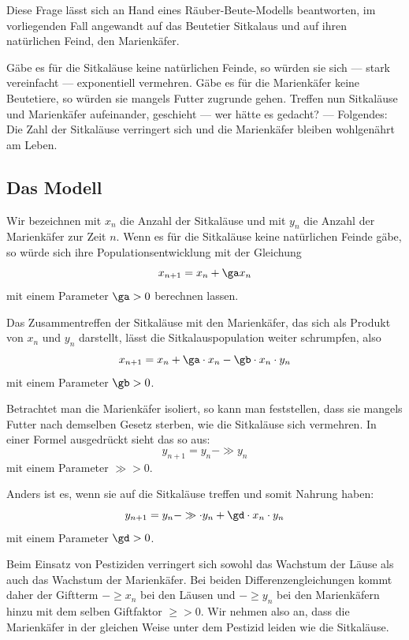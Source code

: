 \documentclass[%
11pt,%
twoside,%
titlepage,%
german,%
headsepline%
]{scrartcl}
\begin{document}
Diese Frage lässt sich an Hand eines Räuber-Beute-Modells beantworten, im vorliegenden Fall angewandt auf das Beutetier Sitkalaus und auf ihren natürlichen Feind, den Marienkäfer.

Gäbe es für die Sitkaläuse keine natürlichen Feinde, so würden sie sich --- stark vereinfacht --- exponentiell vermehren. Gäbe es für die Marienkäfer keine Beutetiere, so würden sie mangels Futter zugrunde gehen. Treffen nun Sitkaläuse und Marienkäfer aufeinander, geschieht --- wer hätte es gedacht? --- Folgendes: Die Zahl der Sitkaläuse verringert sich und die Marienkäfer bleiben wohlgenährt am Leben.

\subsection{Das Modell}
Wir bezeichnen mit $x_n$ die Anzahl der Sitkaläuse und mit $y_n$ die Anzahl der Marienkäfer zur Zeit $n$.
Wenn es für die Sitkaläuse keine natürlichen Feinde gäbe, so würde sich ihre Populationsentwicklung mit der Gleichung
$$x_{n+1}=x_n+\ga x_n$$
mit einem Parameter $\ga > 0$ berechnen lassen.

Das Zusammentreffen der Sitkaläuse mit den Marienkäfer, das sich als Produkt von $x_n$ und $y_n$ darstellt, lässt die Sitkalauspopulation weiter schrumpfen, also
$$x_{n+1}=x_n+\ga\cdot x_n-\gb\cdot x_n\cdot y_n$$
mit einem Parameter $\gb > 0$.

Betrachtet man die Marienkäfer isoliert, so kann man feststellen, dass sie mangels Futter nach demselben Gesetz sterben, wie die Sitkaläuse sich vermehren. In einer Formel ausgedrückt sieht das so aus:
$$y_{n+1}=y_n-\gg y_n$$
mit einem Parameter $\gg > 0$.

Anders ist es, wenn sie auf die Sitkaläuse treffen und somit Nahrung haben:
$$y_{n+1}=y_n-\gg\cdot y_n+\gd\cdot x_n\cdot y_n$$
mit einem Parameter $\gd> 0$.

Beim Einsatz von Pestiziden verringert sich sowohl das Wachstum der Läuse als auch das Wachstum der Marienkäfer. Bei beiden Differenzengleichungen kommt daher der Giftterm $-\ge x_n$ bei den Läusen und $-\ge y_n$ bei den Marienkäfern hinzu mit dem selben Giftfaktor $\ge > 0$. Wir nehmen also an, dass die Marienkäfer in der gleichen Weise unter dem Pestizid leiden wie die Sitkaläuse.
\end{document}
